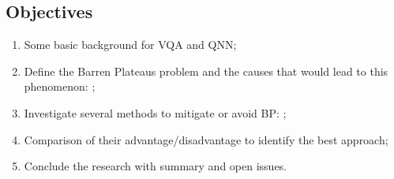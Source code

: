 \subsection{Objectives}

\begin{enumerate}
    \item Some basic background for VQA and QNN;
    \item Define the Barren Plateaus problem and the causes that would lead to this phenomenon: \cite{wangNoiseinducedBarrenPlateaus2021};
    \item Investigate several methods to mitigate or avoid BP: \cite{pesahAbsenceBarrenPlateaus2021, pattiEntanglementDevisedBarren2021,liuParameterInitializationMethod2021};
    \item Comparison of their advantage/disadvantage to identify the best approach;
    \item Conclude the research with summary and open issues.
\end{enumerate}